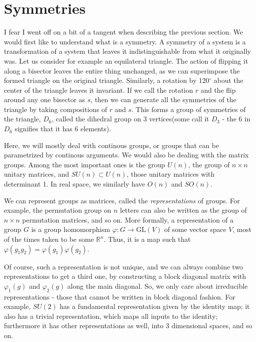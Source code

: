 \documentclass[11pt]{book}
\begin{document}
\section{Symmetries}
I fear I went off on a bit of a tangent when describing the previous section. We would first like to understand what is a symmetry. A symmetry of a system is a transformation of a system that leaves it indistinguishable from what it originally was. Let us consider for example an equilateral triangle. The action of flipping it along a bisector leaves the entire thing unchanged, as we can superimpose the formed triangle on the original triangle. Similarly, a rotation by 120$^\circ$ about the center of the triangle leaves it invariant. If we call the rotation $r$ and the flip around any one bisector as $s$, then we can generate all the symmetries of the triangle by taking compositions of $r$ and $s$. This forms a group of symmetries of the triangle, $D_{6}$, called the dihedral group on 3 vertices(some call it $D_3$ - the 6 in $D_6$ signifies that it has 6 elements).


Here, we will mostly deal with continous groups, or groups that can be parametrized by continous arguments. We would also be dealing with the matrix groups. Among the most important ones is the group $U(n)$, the group of $n \times n$ unitary matrices, and $SU(n) \subset U(n)$, those unitary matrices with determinant 1. In real space, we similarly have $O(n)$ and $SO(n)$.

We can represent groups as matrices, called the \emph{representations} of groups. For example, the permutation group on $n$ letters can also be written as the group of $n \times n$ permutation matrices, and so on. More formally, a representation of a group $G$ is a group homomorphism $\varphi : G \to \text{GL}(V)$ of some vector space $V$, most of the times taken to be some $\mathbb{R}^n$. Thus, it is a map such that $\varphi(g_1g_2) = \varphi(g_1)\varphi(g_2)$.

Of course, such a representation is not unique, and we can always combine two representations to get a third one, by constructing a block diagonal matrix with $\varphi_1(g)$ and $\varphi_2(g)$ along the main diagonal. So, we only care about 
irreducible representations - those that cannot be written in block diagonal fashion. For example, $SU(2)$ has a fundamental representation given by the identity map; it also has a trivial representation, which maps all inputs to the identity; furthermore it has other representations as well, into 3 dimensional spaces, and so on.
\end{document}
